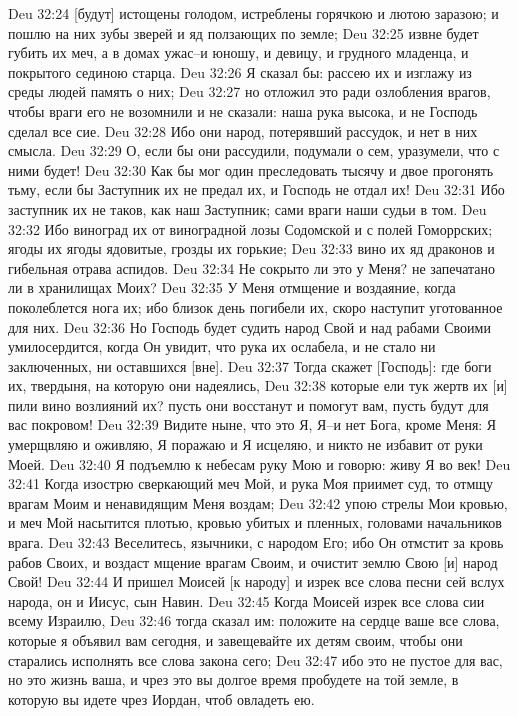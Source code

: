 Deu 32:24  [будут] истощены голодом, истреблены горячкою и лютою заразою; и пошлю на них зубы зверей и яд ползающих по земле;
Deu 32:25  извне будет губить их меч, а в домах ужас--и юношу, и девицу, и грудного младенца, и покрытого сединою старца.
Deu 32:26  Я сказал бы: рассею их и изглажу из среды людей память о них;
Deu 32:27  но отложил это ради озлобления врагов, чтобы враги его не возомнили и не сказали: наша рука высока, и не Господь сделал все сие.
Deu 32:28  Ибо они народ, потерявший рассудок, и нет в них смысла.
Deu 32:29  О, если бы они рассудили, подумали о сем, уразумели, что с ними будет!
Deu 32:30  Как бы мог один преследовать тысячу и двое прогонять тьму, если бы Заступник их не предал их, и Господь не отдал их!
Deu 32:31  Ибо заступник их не таков, как наш Заступник; сами враги наши судьи в том.
Deu 32:32  Ибо виноград их от виноградной лозы Содомской и с полей Гоморрских; ягоды их ягоды ядовитые, грозды их горькие;
Deu 32:33  вино их яд драконов и гибельная отрава аспидов.
Deu 32:34  Не сокрыто ли это у Меня? не запечатано ли в хранилищах Моих?
Deu 32:35  У Меня отмщение и воздаяние, когда поколеблется нога их; ибо близок день погибели их, скоро наступит уготованное для них.
Deu 32:36  Но Господь будет судить народ Свой и над рабами Своими умилосердится, когда Он увидит, что рука их ослабела, и не стало ни заключенных, ни оставшихся [вне].
Deu 32:37  Тогда скажет [Господь]: где боги их, твердыня, на которую они надеялись,
Deu 32:38  которые ели тук жертв их [и] пили вино возлияний их? пусть они восстанут и помогут вам, пусть будут для вас покровом!
Deu 32:39  Видите ныне, что это Я, Я--и нет Бога, кроме Меня: Я умерщвляю и оживляю, Я поражаю и Я исцеляю, и никто не избавит от руки Моей.
Deu 32:40  Я подъемлю к небесам руку Мою и говорю: живу Я во век!
Deu 32:41  Когда изострю сверкающий меч Мой, и рука Моя приимет суд, то отмщу врагам Моим и ненавидящим Меня воздам;
Deu 32:42  упою стрелы Мои кровью, и меч Мой насытится плотью, кровью убитых и пленных, головами начальников врага.
Deu 32:43  Веселитесь, язычники, с народом Его; ибо Он отмстит за кровь рабов Своих, и воздаст мщение врагам Своим, и очистит землю Свою [и] народ Свой!
Deu 32:44  И пришел Моисей [к народу] и изрек все слова песни сей вслух народа, он и Иисус, сын Навин.
Deu 32:45  Когда Моисей изрек все слова сии всему Израилю,
Deu 32:46  тогда сказал им: положите на сердце ваше все слова, которые я объявил вам сегодня, и завещевайте их детям своим, чтобы они старались исполнять все слова закона сего;
Deu 32:47  ибо это не пустое для вас, но это жизнь ваша, и чрез это вы долгое время пробудете на той земле, в которую вы идете чрез Иордан, чтоб овладеть ею.
